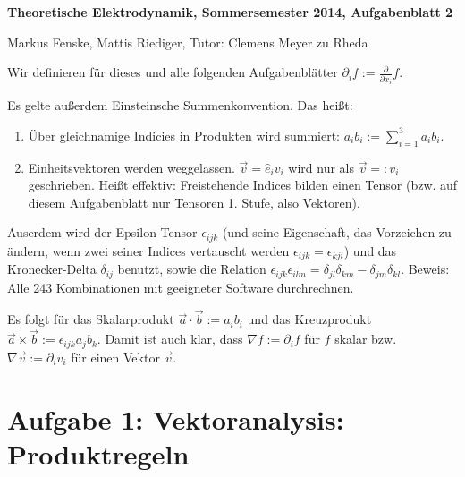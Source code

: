 \documentclass[a4paper,german,12pt,smallheadings]{scrartcl}
\begin{document}
\allowdisplaybreaks %
\begin{center}
\bfseries %
\sffamily %
\vspace{-40pt}
Theoretische Elektrodynamik, Sommersemester 2014, Aufgabenblatt 2

Markus Fenske, Mattis Riediger, Tutor: Clemens Meyer zu Rheda
\vspace{-10pt}
\end{center}

Wir definieren für dieses und alle folgenden Aufgabenblätter $\partial_i f :=
\frac{\partial}{\partial x_i} f$.

Es gelte außerdem Einsteinsche Summenkonvention. Das heißt:

\begin{enumerate}
  \item
    Über gleichnamige Indicies in Produkten wird summiert: $a_ib_i := \sum_{i=1}^3 a_ib_i$.
  \item
    Einheitsvektoren werden weggelassen. $\vec{v} = \hat{e}_iv_i$ wird nur als
    $\vec{v} =: v_i$ geschrieben. Heißt effektiv: Freistehende Indices bilden einen Tensor
    (bzw. auf diesem Aufgabenblatt nur Tensoren 1. Stufe, also Vektoren).
\end{enumerate}

Auserdem wird der Epsilon-Tensor $\epsilon_{ijk}$ (und seine Eigenschaft, das
Vorzeichen zu ändern, wenn zwei seiner Indices vertauscht werden
$\epsilon_{ijk} = \epsilon_{kji}$) und das Kronecker-Delta
$\delta_{ij}$ benutzt, sowie die Relation $\epsilon_{ijk} \epsilon_{ilm} =
\delta_{jl}\delta_{km} - \delta_{jm}\delta_{kl}$. Beweis: Alle 243
Kombinationen mit geeigneter Software durchrechnen.

Es folgt für das Skalarprodukt $\vec{a} \cdot \vec{b} := a_ib_i$ und das
Kreuzprodukt $\vec{a} \times \vec{b} := \epsilon_{ijk} a_j b_k$.  Damit ist auch
klar, dass $\nabla f := \partial_i f$ für $f$ skalar bzw. $\nabla \vec{v} :=
\partial_i v_i$ für einen Vektor $\vec{v}$.

\section*{Aufgabe 1: Vektoranalysis: Produktregeln}
\end{document}
